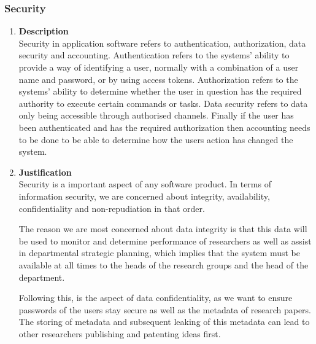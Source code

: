 \documentclass[a4paper,10pt]{article}
\begin{document}
\subsubsection{Security}
\begin{enumerate}
\item \textbf{Description} \\
Security in application software refers to authentication, authorization, data security and accounting. Authentication refers to the systems' ability to provide a way of identifying a user, normally with a combination of a user name and password, or by using access tokens. Authorization refers to the systems' ability to determine whether the user in question has the required authority to execute certain commands or tasks. Data security refers to data only being accessible through authorised channels. Finally if the user has been authenticated and has the required authorization then accounting needs to be done to be able to determine how the users action has changed the system.  
\item \textbf{Justification} \\
Security is a important aspect of any software product. In terms of information security, we are concerned about integrity, availability, confidentiality and non-repudiation in that order. 

The reason we are most concerned about data integrity is that this data will be used to monitor and determine performance of researchers as well as assist in departmental strategic planning, which implies that the system must be available at all times to the heads of the research groups and the head of the department. 

Following this, is the aspect of data confidentiality, as we want to ensure passwords of the users stay secure as well as the metadata of research papers. The storing of metadata and subsequent leaking of this metadata can lead to other researchers publishing and patenting ideas first.


\end{enumerate}
\end{document}
